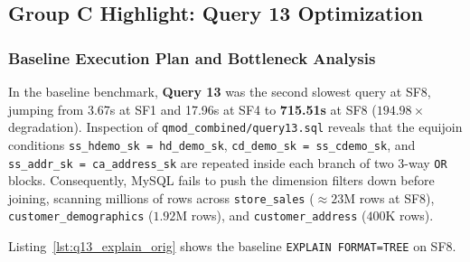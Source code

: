 \documentclass{ULBreport}
\begin{document}
\subsection{Group C Highlight: Query 13 Optimization}

\subsubsection{Baseline Execution Plan and Bottleneck Analysis}
In the baseline benchmark, \textbf{Query 13} was the second slowest query at SF8, jumping from 3.67s at SF1 and 17.96s at SF4 to \textbf{715.51s} at SF8 ($194.98\times$ degradation). Inspection of \texttt{qmod\_combined/query13.sql} reveals that the equijoin conditions \texttt{ss\_hdemo\_sk = hd\_demo\_sk}, \texttt{cd\_demo\_sk = ss\_cdemo\_sk}, and \texttt{ss\_addr\_sk = ca\_address\_sk} are repeated inside each branch of two 3-way \texttt{OR} blocks. Consequently, MySQL fails to push the dimension filters down before joining, scanning millions of rows across \texttt{store\_sales} ($\approx 23\text{M}$ rows at SF8), \texttt{customer\_demographics} ($1.92\text{M}$ rows), and \texttt{customer\_address} ($400\text{K}$ rows).

Listing~\ref{lst:q13_explain_orig} shows the baseline \texttt{EXPLAIN FORMAT=TREE} on SF8.
\end{document}
